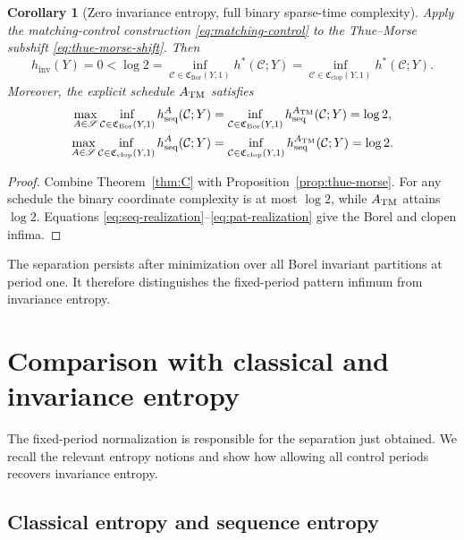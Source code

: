 \documentclass[11pt,reqno]{amsart}
\numberwithin{equation}{section}
\newtheorem{corollary}[theorem]{Corollary}
\theoremstyle{definition}
\newcommand{\C}{\mathcal C}
\newcommand{\hseq}{h_{\mathrm{seq}}}
\newcommand{\hpat}{h^{*}}
\newcommand{\hinv}{h_{\mathrm{inv}}}
\newcommand{\Bor}{\mathrm{Bor}}
\newcommand{\clop}{\mathrm{clop}}
\begin{document}
\begin{corollary}[Zero invariance entropy, full binary sparse-time complexity]
\label{cor:separation}
Apply the matching-control construction \eqref{eq:matching-control} to the
Thue--Morse subshift \eqref{eq:thue-morse-shift}.  Then
\begin{equation}\label{eq:strict-control-separation}
 \hinv(Y)=0
 <\log2
 =\inf_{\C\in\mathfrak C_{\Bor}(Y,1)}\hpat(\C;Y)
 =\inf_{\C\in\mathfrak C_{\clop}(Y,1)}\hpat(\C;Y).
\end{equation}
Moreover, the explicit schedule $A_{\rm TM}$ satisfies
\begin{align}
 \max_{A\in\mathscr S}\inf_{\C\in\mathfrak C_{\Bor}(Y,1)}
 \hseq^A(\C;Y)
 &=\inf_{\C\in\mathfrak C_{\Bor}(Y,1)}\hseq^{A_{\rm TM}}(\C;Y)
 =\log2,
 \label{eq:TM-Borel-sequence}\\
 \max_{A\in\mathscr S}\inf_{\C\in\mathfrak C_{\clop}(Y,1)}
 \hseq^A(\C;Y)
 &=\inf_{\C\in\mathfrak C_{\clop}(Y,1)}\hseq^{A_{\rm TM}}(\C;Y)
 =\log2.
 \label{eq:TM-clopen-sequence}
\end{align}
\end{corollary}

\begin{proof}
Combine Theorem~\ref{thm:C} with Proposition~\ref{prop:thue-morse}.  For any
schedule the binary coordinate complexity is at most $\log2$, while
$A_{\rm TM}$ attains $\log2$.  Equations
\eqref{eq:seq-realization}--\eqref{eq:pat-realization} give the Borel and
clopen infima.
\end{proof}

The separation persists after minimization over all Borel invariant
partitions at period one. It therefore distinguishes the fixed-period
pattern infimum from invariance entropy.


\section{Comparison with classical and invariance entropy}\label{sec:comparison}

The fixed-period normalization is responsible for the separation
just obtained. We recall the relevant entropy notions and show
how allowing all control periods recovers invariance entropy.

\subsection{Classical entropy and sequence entropy}\label{sec:background}
\end{document}
